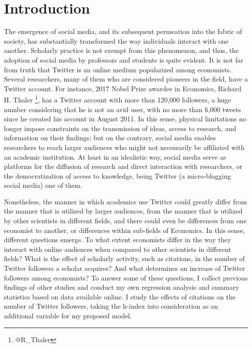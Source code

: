 \documentclass[12pt,english]{article}
\begin{document}
\section{Introduction}\label{sec:intro}
The emergence of social media, and its subsequent permeation into the fabric of society, has substantially transformed the way individuals interact with one another. Scholarly practice is not exempt from this phenomenon, and thus, the adoption of social media by professors and students is quite evident. It is not far from truth that Twitter is an online medium popularized among economists. Several researchers, many of them who are considered pioneers in the field, have a Twitter account. For instance, 2017 Nobel Prize awardee in Economics, Richard H. Thaler \footnote{@R\_{T}haler}, has a Twitter account with more than 120,000 followers, a huge number considering that he is not an avid user, with no more than 6,000 tweets since he created his account in August 2011. In this sense, physical limitations no longer impose constraints on the transmission of ideas, access to research, and information on their findings; but on the contrary, social media enables researchers to reach larger audiences who might not necessarily be affiliated with an academic institution. At least in an idealistic way, social media serve as platforms for the diffusion of research and direct interaction with researchers, or the democratization of access to knowledge, being Twitter (a micro-blogging social media) one of them. 

Nonetheless, the manner in which academics use Twitter could greatly differ from the manner that is utilized by larger audiences, from the manner that is utilized by other scientists in different fields, and there could even be differences from one economist to another, or differences within sub-fields of Economics. In this sense, different questions emerge. To what extent economists differ in the way they interact with online audiences when compared to other scientists in different fields? What is the effect of scholarly activity, such as citations, in the number of Twitter followers a scholar acquires? And what determines an increase of Twitter followers among economists? To answer some of these questions, I collect previous findings of other studies and conduct my own regression analysis and summary statistics based on data available online. I study the effects of citations on the number of Twitter followers, taking the h-index into consideration as an additional variable for my proposed model. 
\end{document}
